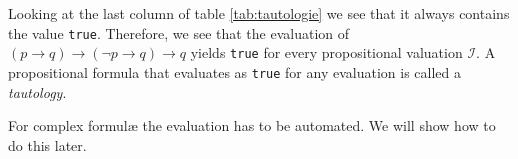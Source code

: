 \begin{table}[!ht]
  \centering
{}
  \caption{Evaluation of $(p \rightarrow q) \rightarrow (\neg p \rightarrow q) \rightarrow q$.}
  \label{tab:tautologie}
\end{table}

Looking at the last column of table \ref{tab:tautologie} we see that it always contains the value
\texttt{true}.  Therefore, we see that the evaluation of
$(p \rightarrow q) \rightarrow (\neg p \rightarrow q) \rightarrow q$
yields \texttt{true} for every propositional valuation $\mathcal{I}$.  
A propositional formula that evaluates as \texttt{true} for any evaluation is called a
\emph{tautology}. 

For complex {formul\ae} the evaluation has to be automated.  We will show how to do this later.

